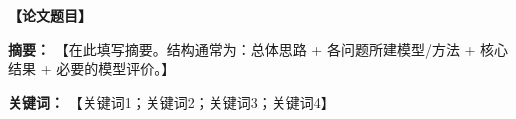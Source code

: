 \begin{center}
    {\bfseries 【论文题目】}
\end{center}

\vspace{0.8em}

\noindent\textbf{摘要：}
【在此填写摘要。结构通常为：总体思路 + 各问题所建模型/方法 + 核心结果 + 必要的模型评价。】

\vspace{0.8em}

\noindent\textbf{关键词：}
【关键词1；关键词2；关键词3；关键词4】
